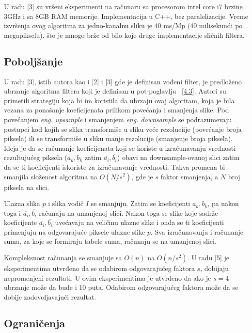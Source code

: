\documentclass[a4paper,12pt,titlepage]{article}
\begin{document}
U radu [3] su vršeni eksperimenti na računaru sa procesorom intel core i7 brzine 3GHz i sa 8GB RAM memorije. Implementacija u C++, bez paralelizacije. Vreme izvršenja ovog algoritma za jedno-kanalnu sliku je 40 ms/Mp (40 milisekundi po megapikselu), što je mnogo brže od bilo koje druge implementacije sličnih filtera. 

\subsection{Poboljšanje}%

U radu [3], istih autora kao i [2] i [3] gde je definisan vođeni filter, je predloženo ubrzanje algoritma filtera koji je definisan u pot-poglavlju ~\ref{4.3}. Autori su primetili strategiju koja bi im koristila da ubrzaju ovaj algoritam, koja je bila vezana za ponašanje koeficijenata prilikom povećanja i smanjenja slike. Pod povećanjem \emph{eng. upsample} i smanjenjem \emph{eng. downsample} se podrazumevaju postupci kod kojih se slika transformiše u sliku veće rezoluciije (povećanje broja piksela) ili se transformiše u sliku manje rezolucije (smanjenje broja piksela). Ideja je da se računanje koeficijenata koji se koriste u izračunavanju vrednosti rezultujućeg piksela ($a_k, b_k$ zatim $\overline{a_i}, \overline{b_i}$) obavi na downsample-ovanoj slici zatim da se ti koeficijenti iskoriste za izračunavanje vrednosti. Takva promena bi smanjila složenost algoritma na $O(N / s^2)$, gde je $s$ faktor smanjenja, a $N$ broj piksela na slici. 

Ulazna slika $p$ i slika vodič $I$ se smanjuju. Zatim se koeficijenti $a_k, b_k$, pa nakon toga i $\overline{a_i}, \overline{b_i}$ računaju na umanjenoj slici. Nakon toga se slike koje sadrže koeficijente $\overline{a_i}, \overline{b_i}$ uvećavaju na veličinu ulazne slike i onda se ti koeficijenti primenjuju na odgovarajuće piksele ulazne slike $p$. Sva izračunavanja i računanje suma, za koje se formiraju tabele suma, računaju se na umanjenoj slici.

Kompleksnost računanja se smanjuje sa $O(n)$ na $O(n / s^2)$. U radu [5] je eksperimentima utvrđeno da se odabirom odgovarajućeg faktora $s$, dobijaju nepromenjeni rezultati. U ovim eksperimentima je utvrđeno da ako je $s = 4$ ubrzanje može da bude i 10 puta. Odabirom odgovarajućeg faktora može da se dobije zadovoljavajući rezultat. 

\subsection{Ograničenja}%
\end{document}
